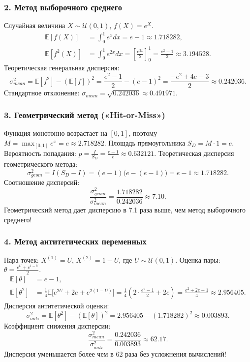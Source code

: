 \documentclass[11pt,a4paper]{article}
\begin{document}
\subsubsection{2. Метод выборочного среднего}
Случайная величина $X \sim \mathcal{U}(0,1)$, $f(X) = e^X$.
\begin{align}
    \mathbb{E}[f(X)] &= \int_0^1 e^x dx = e - 1 \approx 1.718282, \\
    \mathbb{E}[f^2(X)] &= \int_0^1 e^{2x} dx = \left[ \frac{e^{2x}}{2} \right]_0^1 = \frac{e^2 - 1}{2} \approx 3.194528.
\end{align}
Теоретическая генеральная дисперсия:
\begin{equation}
    \sigma^2_{mean} = \mathbb{E}[f^2] - (\mathbb{E}[f])^2 = \frac{e^2 - 1}{2} - (e - 1)^2 = \frac{-e^2 + 4e - 3}{2} \approx 0.242036.
\end{equation}
Стандартное отклонение: $\sigma_{mean} = \sqrt{0.242036} \approx 0.491971$.

\subsubsection{3. Геометрический метод («Hit-or-Miss»)}
Функция монотонно возрастает на $[0,1]$, поэтому $M = \max_{[0,1]} e^x = e \approx 2.718282$.
Площадь прямоугольника $S_D = M \cdot 1 = e$.
Вероятность попадания: $p = \frac{I}{S_D} = \frac{e - 1}{e} \approx 0.632121$.
Теоретическая дисперсия геометрического метода:
\begin{equation}
    \sigma^2_{geom} = I(S_D - I) = (e - 1)\big(e - (e - 1)\big) = e - 1 \approx 1.718282.
\end{equation}
Соотношение дисперсий:
\begin{equation}
    \frac{\sigma^2_{geom}}{\sigma^2_{mean}} = \frac{1.718282}{0.242036} \approx 7.10.
\end{equation}
Геометрический метод дает дисперсию в 7.1 раза выше, чем метод выборочного среднего!

\subsubsection{4. Метод антитетических переменных}
Пара точек: $X^{(1)} = U$, $X^{(2)} = 1 - U$, где $U \sim \mathcal{U}(0,1)$.
Оценка пары: $\theta = \frac{e^U + e^{1 - U}}{2}$.
\begin{align}
    \mathbb{E}[\theta] &= e - 1, \\
    \mathbb{E}[\theta^2] &= \frac{1}{4} \mathbb{E}\big[ e^{2U} + 2e + e^{2(1 - U)} \big] = \frac{1}{4} \left( 2 \cdot \frac{e^2 - 1}{2} + 2e \right) = \frac{e^2 + 2e - 1}{4} \approx 2.956405.
\end{align}
Дисперсия антитетической оценки:
\begin{equation}
    \sigma^2_{anti} = \mathbb{E}[\theta^2] - (\mathbb{E}[\theta])^2 = 2.956405 - (1.718282)^2 \approx 0.003893.
\end{equation}
Коэффициент снижения дисперсии:
\begin{equation}
    \frac{\sigma^2_{mean}}{\sigma^2_{anti}} = \frac{0.242036}{0.003893} \approx 62.17.
\end{equation}
Дисперсия уменьшается более чем в 62 раза без усложнения вычислений!
\end{document}
